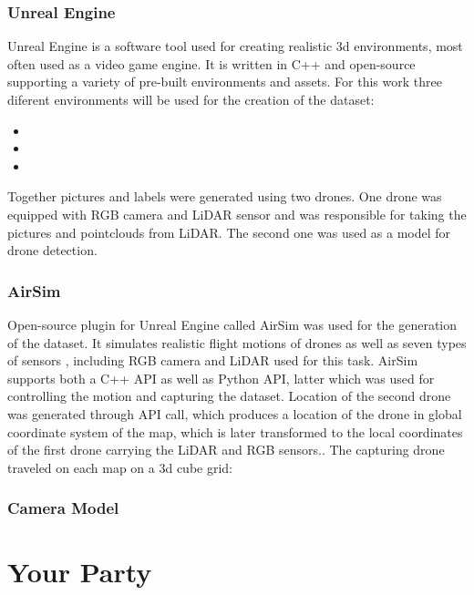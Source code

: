\documentclass[twoside]{ctuthesis}
\theoremstyle{plain}
\theoremstyle{definition}
\theoremstyle{note}
\begin{document}
\section{Unreal Engine}
Unreal Engine is a software tool used for creating realistic 3d environments, most often used as a video game engine.
It is written in C++ and open-source supporting a variety of pre-built environments and assets. For this work three diferent environments will be used for the creation of the dataset:
\begin{itemize}
	\item {}
	\item {}
	\item {}
\end{itemize}
Together  pictures and labels were generated using two drones. One drone was equipped with RGB camera and LiDAR sensor and was responsible for taking the pictures and pointclouds from LiDAR. The second one was used as a model for drone detection.
\section{AirSim}
Open-source plugin for Unreal Engine called AirSim was used for the generation of the dataset. It simulates realistic flight motions of drones as well as seven types of sensors , including RGB camera and LiDAR used for this task. AirSim supports both a C++ API as well as Python API, latter which was used for controlling the motion and capturing the dataset. Location of the second drone was generated through API call, which produces a location of the drone in global coordinate system of the map, which is later transformed to the local coordinates of the first drone carrying the LiDAR and RGB sensors.. The capturing drone traveled on each map on a 3d cube grid:
\section{Camera Model}
 

\part{Your Party}
\end{document}
